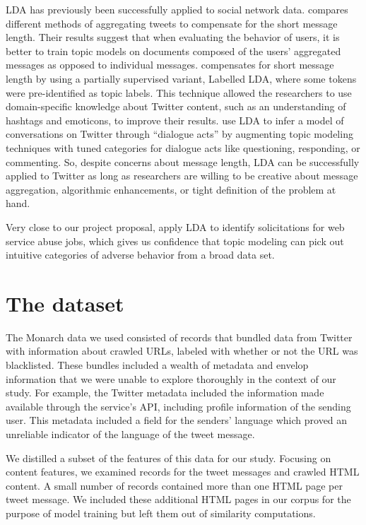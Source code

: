\documentclass[times, 11pt, twocolumn]{article}
\begin{document}
LDA has previously been successfully applied to social network data. \cite{Hong2010} compares different methods of aggregating tweets to compensate for the short message length. Their results suggest that when evaluating the behavior of users, it is better to train topic models on documents composed of the users' aggregated messages as opposed to individual messages. \cite{Ramage2010} compensates for short message length by using a partially supervised variant, Labelled LDA, where some tokens were pre-identified as topic labels. This technique allowed the researchers to use domain-specific knowledge about Twitter content, such as an understanding of hashtags and emoticons, to improve their results. \cite{Ritter2010} use LDA to infer a model of conversations on Twitter through ``dialogue acts'' by augmenting topic modeling techniques with tuned categories for dialogue acts like questioning, responding, or commenting. So, despite concerns about message length, LDA can be successfully applied to Twitter as long as researchers are willing to be creative about message aggregation, algorithmic enhancements, or tight definition of the problem at hand.

Very close to our project proposal, \cite{Kim2011} apply LDA to identify solicitations for web service abuse jobs, which gives us confidence that topic modeling can pick out intuitive categories of adverse behavior from a broad data set. 


\section{The dataset}

The Monarch data we used consisted of records that bundled data from Twitter with information about crawled URLs, labeled with whether or not the URL was blacklisted.
These bundles included a wealth of metadata and envelop information that we were unable to explore thoroughly in the context of our study.
For example, the Twitter metadata included the information made available through the service's API, including profile information of the sending user.
This metadata included a field for the senders' language which proved an unreliable indicator of the language of the tweet message.

We distilled a subset of the features of this data for our study.
Focusing on content features, we examined records for the tweet messages and crawled HTML content.
A small number of records contained more than one HTML page per tweet message.
We included these additional HTML pages in our corpus for the purpose of model training but left them out of similarity computations.
\end{document}
